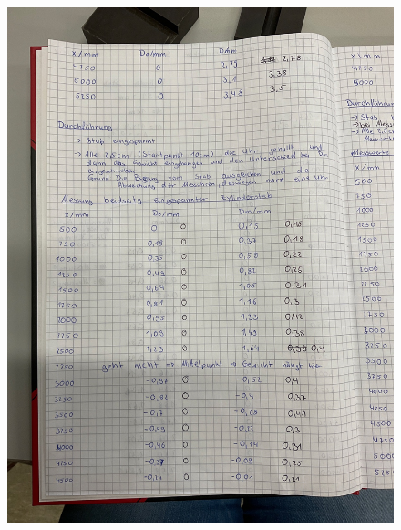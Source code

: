 \begin{figure}[h]
    \centering
    \includegraphics[angle=90, width=\textwidth]{content/KladdeS2.jpeg}
\end{figure}
